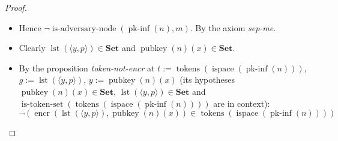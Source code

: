 \documentclass[11pt]{article}
\theoremstyle{plain}
\begin{document}
\begin{proof}
\begin{itemize}[leftmargin=2.8em, itemsep=4pt, parsep=1pt]
\begin{itemize}[leftmargin=2.8em, itemsep=4pt, parsep=1pt]
  \item[\textbf{283--284}] Hence $\neg \operatorname{is\text{-}adversary\text{-}node}(\operatorname{pk\text{-}inf}(n), m)$. By the axiom \emph{sep-me}.
  \item[\textbf{285--286}] Clearly $\operatorname{lst}(\langle y, p \rangle) \in \mathbf{Set}$ and $\operatorname{pubkey}(n)(x) \in \mathbf{Set}$.
  \item[\textbf{287}] By the proposition \emph{token-not-encr} at $t := \operatorname{tokens}(\operatorname{ispace}(\operatorname{pk\text{-}inf}(n)))$, $g := \operatorname{lst}(\langle y, p \rangle)$, $y := \operatorname{pubkey}(n)(x)$ (its hypotheses $\operatorname{pubkey}(n)(x) \in \mathbf{Set}$, $\operatorname{lst}(\langle y, p \rangle) \in \mathbf{Set}$ and $\operatorname{is\text{-}token\text{-}set}(\operatorname{tokens}(\operatorname{ispace}(\operatorname{pk\text{-}inf}(n))))$ are in context):
\begin{equation*}
\neg (\operatorname{encr}(\operatorname{lst}(\langle y, p \rangle), \operatorname{pubkey}(n)(x)) \in \operatorname{tokens}(\operatorname{ispace}(\operatorname{pk\text{-}inf}(n))))
\end{equation*}


\end{itemize}
\end{itemize}
\end{proof}
\end{document}

